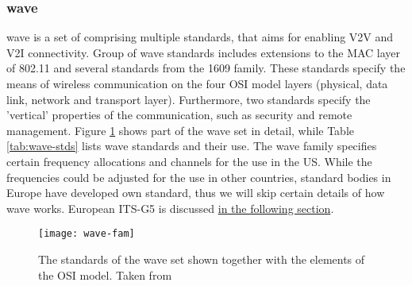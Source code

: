 \subsubsection{\acrshort{wave}}
% 
\begin{center}
\end{center}\par
% 
\acrfull{wave} is a set of comprising multiple standards, that aims for enabling \acrshort{V2V} and \acrshort{V2I} connectivity. Group of \acrshort{wave} standards includes extensions to the \acrshort{MAC} layer of 802.11 and several standards from the 1609 family. These standards specify the means of wireless communication on the four OSI model layers (physical, data link, network and transport layer). Furthermore, two standards specify the 'vertical' properties of the communication, such as security and remote management. Figure \ref{fig:wave-fam} shows part of the \acrshort{wave} set in detail, while Table \ref{tab:wave-stds} lists \acrshort{wave} standards and their use. The \acrshort{wave} family specifies certain frequency allocations and channels for the use in the US. While the frequencies could be adjusted for the use in other countries, standard bodies in Europe have developed own standard, thus we will skip certain details of how \acrshort{wave} works. European ITS-G5 is discussed \hyperref[sec:ITS-G5]{in the following section}.\par
% 
\begin{figure}
    \centering
    \texttt{[image: wave-fam]}
    \caption{The standards of the \acrshort{wave} set shown together with the elements of the OSI model. Taken from \cite{VehicularTechnologySociety2014IEEEArchitecture}}
    \label{fig:wave-fam}
\end{figure}

